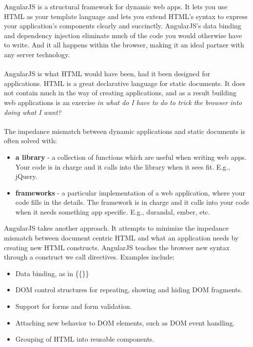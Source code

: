 \documentclass[12pt]{article}
\begin{document}
	AngularJS is a structural framework for dynamic web apps. It lets you use HTML as your template language and lets you extend HTML's syntax to express your application's components clearly and succinctly. AngularJS's data binding and dependency injection eliminate much of the code you would otherwise have to write.  And it all happens within the browser, making it an ideal partner with any server technology.
	\\
	\\
	AngularJS is what HTML would have been, had it been designed for applications. HTML is a great declarative language for static documents. It does not contain much in the way of creating applications, and as a result building web applications is an exercise \textit{in what do I have to do to trick the browser into doing what I want?}
	\\
	\\
	The impedance mismatch between dynamic applications and static documents is often solved with:
	\begin{itemize}
		
		\item \textbf{a library} - a collection of functions which are useful when writing web apps. Your code is in charge and it calls into the library when it sees fit. E.g., \colorbox{mygray}{jQuery}.
		\item \textbf{frameworks} - a particular implementation of a web application, where your code fills in the details. The framework is in charge and it calls into your code when it needs something app specific. E.g., \colorbox{mygray}{durandal}, \colorbox{mygray}{ember}, etc.
	\end{itemize}
	AngularJS takes another approach. It attempts to minimize the impedance mismatch between document centric HTML and what an application needs by creating new HTML constructs. AngularJS teaches the browser new syntax through a construct we call directives. Examples include:
	\begin{itemize}
		\item Data binding, as in \{\{\}\}
		\item DOM control structures for repeating, showing and hiding DOM fragments.
		\item Support for forms and form validation.
		\item Attaching new behavior to DOM elements, such as DOM event handling.
		\item Grouping of HTML into reusable components.
	\end{itemize}
	
	
	
	\listoffigures
	
\end{document}
